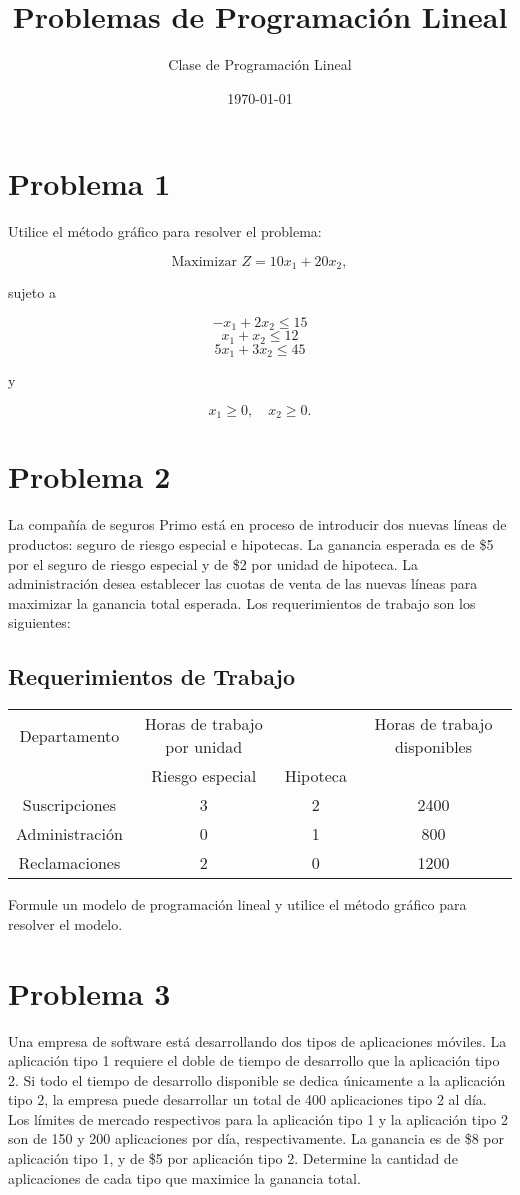 \documentclass{article}
\title{Problemas de Programación Lineal}
\author{Clase de Programación Lineal}
\date{\today}
\begin{document}
\maketitle

\section{Problema 1}
Utilice el método gráfico para resolver el problema:

\[
\text{Maximizar } Z = 10x_1 + 20x_2,
\]

sujeto a

\[
-x_1 + 2x_2 \leq 15
\]
\[
x_1 + x_2 \leq 12
\]
\[
5x_1 + 3x_2 \leq 45
\]

y

\[
x_1 \geq 0, \quad x_2 \geq 0.
\]

\section{Problema 2}
La compañía de seguros Primo está en proceso de introducir dos nuevas líneas de productos: seguro de riesgo especial e hipotecas. La ganancia esperada es de \$5 por el seguro de riesgo especial y de \$2 por unidad de hipoteca. La administración desea establecer las cuotas de venta de las nuevas líneas para maximizar la ganancia total esperada. Los requerimientos de trabajo son los siguientes:

\subsection{Requerimientos de Trabajo}
\begin{tabular}{|c|c|c|c|}
\hline
Departamento & Horas de trabajo por unidad & & Horas de trabajo disponibles \\
 & Riesgo especial & Hipoteca & \\
\hline
Suscripciones & 3 & 2 & 2400 \\
\hline
Administración & 0 & 1 & 800 \\
\hline
Reclamaciones & 2 & 0 & 1200 \\
\hline
\end{tabular}

Formule un modelo de programación lineal y utilice el método gráfico para resolver el modelo.

\section{Problema 3}
Una empresa de software está desarrollando dos tipos de aplicaciones móviles. La aplicación tipo 1 requiere el doble de tiempo de desarrollo que la aplicación tipo 2. Si todo el tiempo de desarrollo disponible se dedica únicamente a la aplicación tipo 2, la empresa puede desarrollar un total de 400 aplicaciones tipo 2 al día. Los límites de mercado respectivos para la aplicación tipo 1 y la aplicación tipo 2 son de 150 y 200 aplicaciones por día, respectivamente. La ganancia es de \$8 por aplicación tipo 1, y de \$5 por aplicación tipo 2. Determine la cantidad de aplicaciones de cada tipo que maximice la ganancia total.
\end{document}
